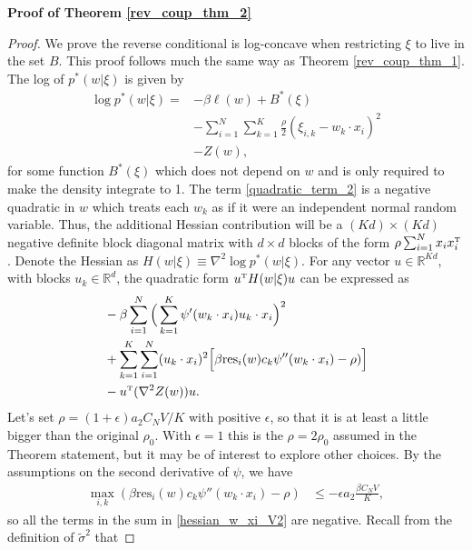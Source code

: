 \documentclass{article}
\numberwithin{equation}{section}
\theoremstyle{Lemma}
\theoremstyle{Corollary}
\theoremstyle{Theorem}
\theoremstyle{Remark}
\begin{document}
\vspace{0.2cm}
\textbf{Proof of Theorem \ref{rev_coup_thm_2}}
\begin{proof}
We prove the reverse conditional is log-concave when restricting $\xi$ to live in the set $B$. This proof follows much the same way as Theorem \ref{rev_coup_thm_1}.
    The log of $p^{*}(w|\xi)$ is given by
    \begin{align}
        \log p^{*}(w|\xi)=& - \beta \ell(w)+B^*(\xi)\\
        &-\sum_{i=1}^{N}\sum_{k=1}^{K}\frac{\rho}{2}(\xi_{i,k}-w_{k}\cdot x_{i})^{2} \label{quadratic_term_2}\\
       & - Z(w),
    \end{align}
    for some function $B^*(\xi)$ which does not depend on $w$ and is only required to make the density integrate to 1. The term \eqref{quadratic_term_2} is a negative quadratic in $w$ which treats each $w_{k}$ as if it were an independent normal random variable. Thus, the additional Hessian contribution will be a $(Kd) \times (Kd)$ negative definite block diagonal matrix with $d \times d$ blocks of the form $\rho\sum_{i=1}^{N}x_{i}x_{i}^{\text{\tiny{T}}}$. Denote the Hessian as $H(w|\xi)\equiv \nabla^{2} \log p^{*}(w|\xi)$. For any vector $u \in \mathbb{R}^{Kd}$, with blocks $u_{k} \in \mathbb{R}^{d}$, the quadratic form $u^{\text{\tiny{T}}}H(w|\xi)u$ can be expressed as
    \begin{align}
    &-\beta\sum_{i=1}^{N}\Big(\sum_{k=1}^{K} \psi'(w_{k}\cdot x_{i})u_{k}\cdot x_{i}\Big)^{2}\\
    &+\sum_{k=1}^{K}\sum_{i=1}^{N}(u_{k}\cdot x_{i})^{2}\Big[ \beta \text{res}_{i}(w)c_{k}\psi''(w_{k}\cdot x_{i})-\rho)\Big]\label{hessian_w_xi_V2}\\
    &-u^{\text{\tiny{T}}}(\nabla^{2}Z(w))u.\label{bonus_Hessian_term}
    \end{align}
   Let's set $\rho=(1+\epsilon) a_2 C_N V/K$ with positive $\epsilon$, so that it is at least a little bigger than the original $\rho_0$.  With $\epsilon=1$ this is the $\rho=2\rho_0$ assumed in the Theorem statement, but it may be of interest to explore other choices.
    By the assumptions on the second derivative of $\psi$, we have
    \begin{align}
        \max_{i,k}(\beta \text{res}_{i}(w)c_{k}\psi''(w_{k}\cdot x_{i})-\rho)&\leq - \epsilon a_{2}\frac{\beta C_{N}V}{K},
    \end{align}
    so all the terms in the sum in \eqref{hessian_w_xi_V2} are negative. Recall from the definition of $\tilde{\sigma}^{2}$ that

\end{proof}
\end{document}
